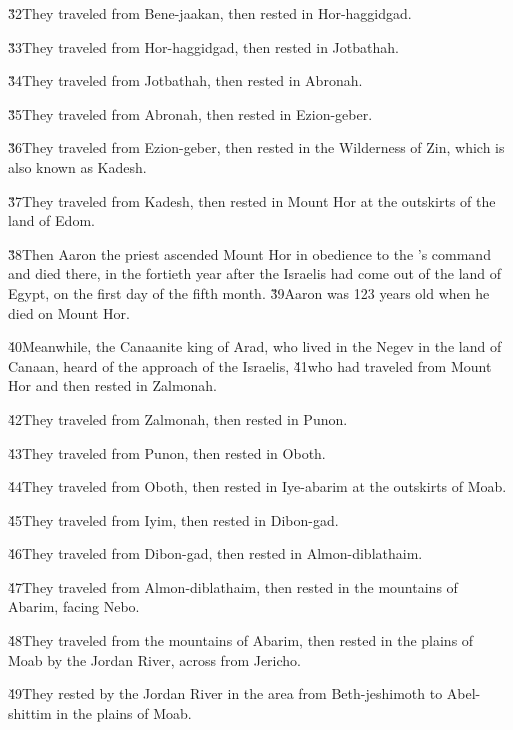 \v{32}They traveled from Bene-jaakan, then rested in Hor-haggidgad.

\v{33}They traveled from Hor-haggidgad, then rested in Jotbathah.

\v{34}They traveled from Jotbathah, then rested in Abronah.

\v{35}They traveled from Abronah, then rested in Ezion-geber.

\v{36}They traveled from Ezion-geber, then rested in the Wilderness of Zin, which is also known as Kadesh.

\v{37}They traveled from Kadesh, then rested in Mount Hor at the outskirts of the land of Edom.

\v{38}Then Aaron the priest ascended Mount Hor in obedience to the 's command and died there, in the fortieth year after the Israelis had come out of the land of Egypt, on the first day of the fifth month. \v{39}Aaron was 123 years old when he died on Mount Hor.

\v{40}Meanwhile, the Canaanite king of Arad, who lived in the Negev in the land of Canaan, heard of the approach of the Israelis, \v{41}who had traveled from Mount Hor and then rested in Zalmonah.

\v{42}They traveled from Zalmonah, then rested in Punon.

\v{43}They traveled from Punon, then rested in Oboth.

\v{44}They traveled from Oboth, then rested in Iye-abarim at the outskirts of Moab.

\v{45}They traveled from Iyim, then rested in Dibon-gad.

\v{46}They traveled from Dibon-gad, then rested in Almon-diblathaim.

\v{47}They traveled from Almon-diblathaim, then rested in the mountains of Abarim, facing Nebo.

\v{48}They traveled from the mountains of Abarim, then rested in the plains of Moab by the Jordan River, across from Jericho.

\v{49}They rested by the Jordan River in the area from Beth-jeshimoth to Abel-shittim in the plains of Moab.

